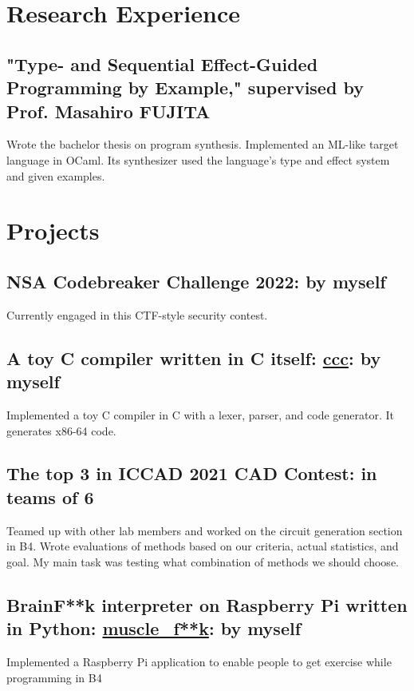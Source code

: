 \documentclass[10pt]{article}
\begin{document}
\section*{Research Experience}
  \subsection*{"Type- and Sequential Effect-Guided Programming by Example," supervised by Prof. Masahiro FUJITA}
    Wrote the bachelor thesis on program synthesis.
    Implemented an ML-like target language in OCaml.
    Its synthesizer used the language's type and effect system and given examples.

\section*{Projects}
  \subsection*{NSA Codebreaker Challenge 2022: \textbf{by myself}}
    Currently engaged in this CTF-style security contest.
  \subsection*{A toy C compiler written in C itself: \href{https://github.com/diohabara/ccc}{ccc}: \textbf{by myself}}
    Implemented a toy C compiler in C with a lexer, parser, and code generator.
    It generates x86-64 code.
  \subsection*{The top 3 in ICCAD 2021 CAD Contest: \textbf{in teams of 6}}
    Teamed up with other lab members and worked on the circuit generation section in B4.
    Wrote evaluations of methods based on our criteria, actual statistics, and goal.
    My main task was testing what combination of methods we should choose.
  \subsection*{BrainF**k interpreter on Raspberry Pi written in Python: \href{https://github.com/diohabara/muscle_fuck}{muscle\_f**k}: \textbf{by myself}}
    Implemented a Raspberry Pi application to enable people to get exercise while programming in B4
\end{document}
